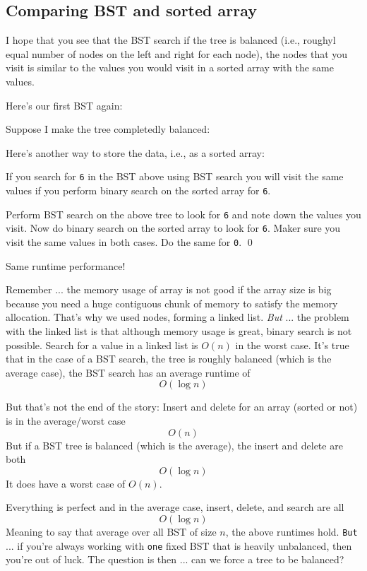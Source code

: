   
\newpage
\subsection{Comparing BST and sorted array}

I hope that you see that the BST search if the tree is balanced (i.e.,
roughyl equal number of nodes on the left and right for each node),
the nodes that you visit is similar to the values you would
visit in a sorted array with the same values.

Here's our first BST again:



Suppose I make the tree completedly balanced:


Here's another way to store the data, i.e., as a sorted array:


If you search for \texttt{6} in the BST above using BST search you will
visit the same values if you perform binary search on the sorted array for
\texttt{6}.


\newpage
\begin{ex}
Perform BST search on the above tree to look for \texttt{6}
and note down
the values you visit.
Now do binary search on the sorted array to look for \texttt{6}.
Maker sure you visit the same values in both cases.
Do the same for \texttt{0}.
\qed
\end{ex}


\newpage
Same runtime performance!

Remember ... the memory usage of array is not good if the array size
is big because you need a huge contiguous chunk of memory to satisfy
the memory allocation.
That's why we used nodes, forming a linked list.
\textit{But} ... the problem with the linked list is that
although memory usage is great, binary search is not possible.
Search for a value in a linked list is $O(n)$ in the worst case.
It's true that in the case of a BST search, 
the tree is roughly balanced (which is the average case),
the BST search has an average runtime of
\[
O(\log n)
\]

But that's not the end of the story:
Insert and delete for an array (sorted or not)
is in the average/worst case
\[
O(n)
\]
But if a BST tree is balanced (which is the average),
the insert and delete are both
\[
O(\log n)
\]
It does have a worst case of $O(n)$.

Everything is perfect and in the average case,
insert, delete, and search are all
\[
O(\log n)
\]
Meaning to say that average over all BST of size $n$,
the above runtimes hold.
\texttt{But} ... if you're always working with
\texttt{one} fixed BST that is heavily unbalanced,
then you're out of luck.
The question is then ... can we force a tree to be balanced?
